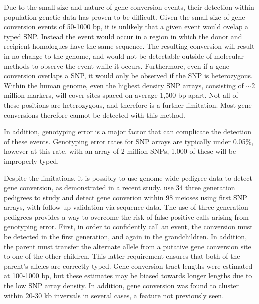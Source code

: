 


Due to the small size and nature of gene conversion events, their detection within population genetic data has proven to be difficult.
Given the small size of gene conversion events of 50-1000 bp, it is unlikely that a given event would ovelap a typed SNP.
Instead the event would occur in a region in which the donor and recipient homologues have the same sequence.
The resulting conversion will result in no change to the genome, and would not be detectable outside of molecular methods to observe the event while it occurs.
Furthermore, even if a gene conversion overlaps a SNP, it would only be observed if the SNP is heterozygous.
Within the human genome, even the highest density SNP arrays, consisting of $\sim$2 million markers, will cover sites spaced on average 1,500 bp apart.
Not all of these positions are heterozygous, and therefore is a further limitation.
Most gene conversions therefore cannot be detected with this method.

In addition, genotyping error is a major factor that can complicate the detection of these events.
Genotyping error rates for SNP arrays are typically under 0.05\%\cite{Imai2010}, however at this rate, with an array of 2 million SNPs, 1,000 of these will be improperly typed.

Despite the limitations, it is possibly to use genome wide pedigree data to detect gene conversion, as demonstrated in a recent study.
\citet{Williams2015} use 34 three generation pedigrees to study and detect gene converion within 98 meioses using first SNP arrays, with follow up validation via sequence data.
The use of three generation pedigrees provides a way to overcome the risk of false positive calls arising from genotyping error.
First, in order to confidently call an event, the conversion must be detected in the first generation, and again in the grandchildren.
In addition, the parent must transfer the alternate allele from a putative gene conversion site to one of the other children.
This latter requirement ensures that both of the parent's alleles are correctly typed.
Gene conversion tract lengths were estimated at 100-1000 bp, but these estimates may be biased towards longer lengths due to the low SNP array density.
In addition, gene conversion was found to cluster within 20-30 kb invervals in several cases, a feature not previously seen.


